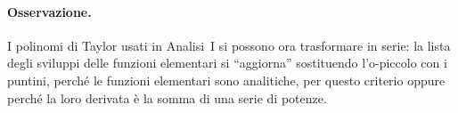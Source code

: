 \paragraph{Osservazione.}
I polinomi di Taylor usati in Analisi~I si possono ora trasformare in serie: la lista degli sviluppi delle
funzioni elementari si ``aggiorna'' sostituendo l'o-piccolo con i puntini, perché le funzioni elementari sono
analitiche, per questo criterio oppure perché la loro derivata è la somma di una serie di potenze.


